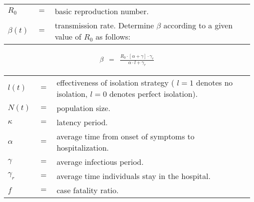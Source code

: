 \documentclass[11pt, onecolumn, fleqn]{article}
\begin{document}
\vspace{0.25cm}

\begin{tabular}{ l c p{12cm} }
$R_{0}$ & $=$ & basic reproduction number. \\
$\beta (t)$ & $=$ & transmission rate. Determine $\beta$ according to a given value of $R_{0}$ as follows: \\
\end{tabular}
\begin{eqnarray}
\beta & = & \frac{R_{0} \cdot \left[ \alpha + \gamma \right] \cdot \gamma_{r}}{\alpha \cdot l + \gamma_r}
\end{eqnarray}

\vspace{0.25cm}

\begin{tabular}{ l c p{12cm} }
$l(t)$ & $=$ & effectiveness of isolation strategy ( $l = 1$ denotes no isolation, $l = 0$ denotes perfect isolation). \\
$N(t)$ & $=$ & population size. \\
$\kappa$ & $=$ & latency period. \\
$\alpha$ & $=$ & average time from onset of symptoms to hospitalization. \\
$\gamma$ & $=$ & average infectious period. \\
$\gamma_{r}$ & $=$ & average time individuals stay in the hospital. \\
$f$ & $=$ & case fatality ratio. \\
\end{tabular}

\end{document}
